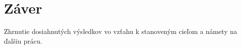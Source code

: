 \chapter*{Záver}  %

Zhrnutie dosiahnutých výsledkov vo vzťahu k stanoveným cieľom a námety na ďalšiu prácu.

